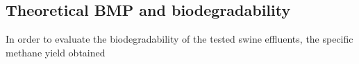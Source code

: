 \subsection{Theoretical BMP and biodegradability}
In order to evaluate the biodegradability of the tested swine effluents, the specific methane yield obtained 
